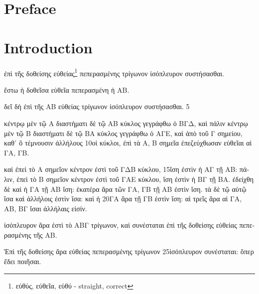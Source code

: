 \documentclass{book}
\begin{document}
\addtocounter{page}{2}

\chapter*{Preface}

\setcounter{tocdepth}{3}
\tableofcontents

\mainmatter

\chapter{Introduction}
\begin{otherlanguage}{greek}
ἐπὶ τῆς δοθείσης εὐθείας\footnote{εὐθύς, εὐθεῖα, εὐθύ - straight, correct}
πεπερασμένης τρίγωνον ἰσόπλευρον συστήσασθαι.

ἔστω ἡ δοθεῖσα εὐθεῖα πεπερασμένη ἡ ΑΒ.

δεῖ δὴ ἐπὶ τῆς ΑΒ εὐθείας τρίγωνον ἰσόπλευρον συστήσασθαι.
5

κέντρῳ μὲν τῷ Α διαστήματι δὲ τῷ ΑΒ κύκλος γεγράφθω ὁ ΒΓΔ, καὶ πάλιν κέντρῳ μὲν τῷ Β διαστήματι δὲ τῷ ΒΑ κύκλος γεγράφθω ὁ ΑΓΕ, καὶ ἀπὸ τοῦ Γ σημείου, καθ᾽ ὃ τέμνουσιν ἀλλήλους
10οἱ κύκλοι, ἐπὶ τὰ Α, Β σημεῖα ἐπεζεύχθωσαν εὐθεῖαι αἱ ΓΑ, ΓΒ.

καὶ ἐπεὶ τὸ Α σημεῖον κέντρον ἐστὶ τοῦ ΓΔΒ κύκλου,
15ἴση ἐστὶν ἡ ΑΓ τῇ ΑΒ: πάλιν, ἐπεὶ τὸ Β σημεῖον κέντρον ἐστὶ τοῦ ΓΑΕ κύκλου, ἴση ἐστὶν ἡ ΒΓ τῇ ΒΑ. ἐδείχθη δὲ καὶ ἡ ΓΑ τῇ ΑΒ ἴση: ἑκατέρα ἄρα τῶν ΓΑ, ΓΒ τῇ ΑΒ ἐστὶν ἴση. τὰ δὲ τῷ αὐτῷ ἴσα καὶ ἀλλήλοις ἐστὶν ἴσα: καὶ ἡ
20ΓΑ ἄρα τῇ ΓΒ ἐστὶν ἴση: αἱ τρεῖς ἄρα αἱ ΓΑ, ΑΒ, ΒΓ ἴσαι ἀλλήλαις εἰσίν.

ἰσόπλευρον ἄρα ἐστὶ τὸ ΑΒΓ τρίγωνον, καὶ συνέσταται ἐπὶ τῆς δοθείσης εὐθείας πεπερασμένης τῆς ΑΒ.

Ἐπὶ τῆς δοθείσης ἄρα εὐθείας πεπερασμένης τρίγωνον
25ἰσόπλευρον συνέσταται: ὅπερ ἔδει ποιῆσαι.
\end{otherlanguage}
\end{document}
